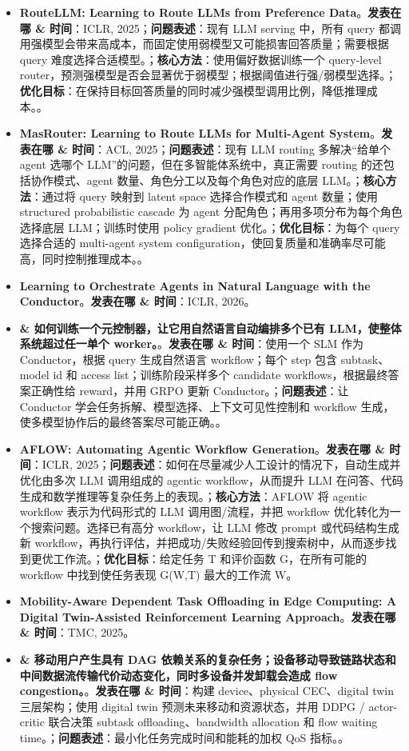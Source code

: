 \documentclass[a4paper,twocolumn,10pt]{ctexart}
\begin{document}
\begin{itemize}
\item \textbf{RouteLLM: Learning to Route LLMs from Preference Data}。\textbf{发表在哪 \& 时间}：ICLR, 2025；\textbf{问题表述}：现有 LLM serving 中，所有 query 都调用强模型会带来高成本，而固定使用弱模型又可能损害回答质量；需要根据 query 难度选择合适模型。；\textbf{核心方法}：使用偏好数据训练一个 query-level router，预测强模型是否会显著优于弱模型；根据阈值进行强/弱模型选择。；\textbf{优化目标}：在保持目标回答质量的同时减少强模型调用比例，降低推理成本。。
\item \textbf{MasRouter: Learning to Route LLMs for Multi-Agent System}。\textbf{发表在哪 \& 时间}：ACL, 2025；\textbf{问题表述}：现有 LLM routing 多解决“给单个 agent 选哪个 LLM”的问题，但在多智能体系统中，真正需要 routing 的还包括协作模式、agent 数量、角色分工以及每个角色对应的底层 LLM。；\textbf{核心方法}：通过将 query 映射到 latent space 选择合作模式和 agent 数量；使用 structured probabilistic cascade 为 agent 分配角色；再用多项分布为每个角色选择底层 LLM；训练时使用 policy gradient 优化。；\textbf{优化目标}：为每个 query 选择合适的 multi-agent system configuration，使回复质量和准确率尽可能高，同时控制推理成本。。
\item \textbf{Learning to Orchestrate Agents in Natural Language with the Conductor}。\textbf{发表在哪 \& 时间}：ICLR, 2026。
\item \textbf{\& 如何训练一个元控制器，让它用自然语言自动编排多个已有 LLM，使整体系统超过任一单个 worker。}。\textbf{发表在哪 \& 时间}：使用一个 SLM 作为 Conductor，根据 query 生成自然语言 workflow；每个 step 包含 subtask、model id 和 access list；训练阶段采样多个 candidate workflows，根据最终答案正确性给 reward，并用 GRPO 更新 Conductor。；\textbf{问题表述}：让 Conductor 学会任务拆解、模型选择、上下文可见性控制和 workflow 生成，使多模型协作后的最终答案尽可能正确。。
\item \textbf{AFLOW: Automating Agentic Workflow Generation}。\textbf{发表在哪 \& 时间}：ICLR, 2025；\textbf{问题表述}：如何在尽量减少人工设计的情况下，自动生成并优化由多次 LLM 调用组成的 agentic workflow，从而提升 LLM 在问答、代码生成和数学推理等复杂任务上的表现。；\textbf{核心方法}：AFLOW 将 agentic workflow 表示为代码形式的 LLM 调用图/流程，并把 workflow 优化转化为一个搜索问题。选择已有高分 workflow，让 LLM 修改 prompt 或代码结构生成新 workflow，再执行评估，并把成功/失败经验回传到搜索树中，从而逐步找到更优工作流。；\textbf{优化目标}：给定任务 T 和评价函数 G，在所有可能的 workflow 中找到使任务表现 G(W,T) 最大的工作流 W。
\item \textbf{Mobility-Aware Dependent Task Offloading in Edge Computing: A Digital Twin-Assisted Reinforcement Learning Approach}。\textbf{发表在哪 \& 时间}：TMC, 2025。
\item \textbf{\& 移动用户产生具有 DAG 依赖关系的复杂任务；设备移动导致链路状态和中间数据流传输代价动态变化，同时多设备并发卸载会造成 flow congestion。}。\textbf{发表在哪 \& 时间}：构建 device、physical CEC、digital twin 三层架构；使用 digital twin 预测未来移动和资源状态，并用 DDPG / actor-critic 联合决策 subtask offloading、bandwidth allocation 和 flow waiting time。；\textbf{问题表述}：最小化任务完成时间和能耗的加权 QoS 指标。。
\end{itemize}
\end{document}
